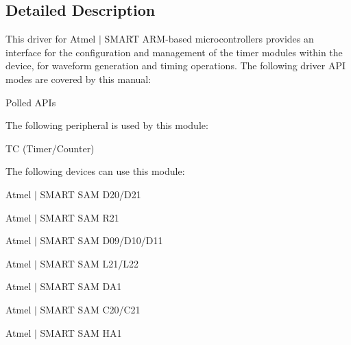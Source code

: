 \subsection{Detailed Description}
This driver for Atmel\textregistered{} $\vert$ S\+M\+A\+RT A\+RM\textregistered{}-\/based microcontrollers provides an interface for the configuration and management of the timer modules within the device, for waveform generation and timing operations. The following driver A\+PI modes are covered by this manual\+:


\begin{DoxyItemize}
\item Polled A\+P\+Is
\end{DoxyItemize}

The following peripheral is used by this module\+:
\begin{DoxyItemize}
\item TC (Timer/\+Counter)
\end{DoxyItemize}

The following devices can use this module\+:
\begin{DoxyItemize}
\item Atmel $\vert$ S\+M\+A\+RT S\+AM D20/\+D21
\item Atmel $\vert$ S\+M\+A\+RT S\+AM R21
\item Atmel $\vert$ S\+M\+A\+RT S\+AM D09/\+D10/\+D11
\item Atmel $\vert$ S\+M\+A\+RT S\+AM L21/\+L22
\item Atmel $\vert$ S\+M\+A\+RT S\+AM D\+A1
\item Atmel $\vert$ S\+M\+A\+RT S\+AM C20/\+C21
\item Atmel $\vert$ S\+M\+A\+RT S\+AM H\+A1
\end{DoxyItemize}

